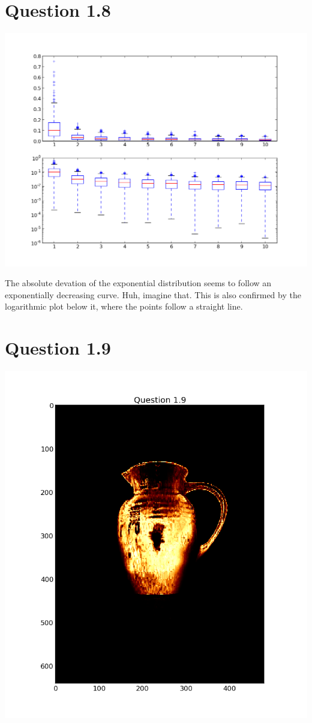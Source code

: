 \documentclass[11pt,a4paper]{article}
\begin{document}
\section{Question 1.8}
\includegraphics[width=1.1\textwidth]{figure_6.png}

The absolute devation of the exponential distribution seems to follow an exponentially decreasing curve. Huh, imagine that. This is also confirmed by the logarithmic plot below it, where the points follow a straight line.
\section{Question 1.9}
\includegraphics[width=1.1\textwidth]{figure_7.png}
\end{document}
